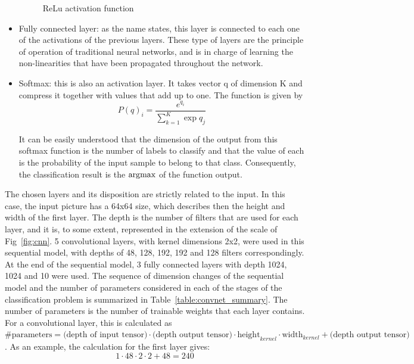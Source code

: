 \begin{itemize}
\begin{figure}[!htb]
              \caption{ReLu activation function}
              \label{fig:maxpool}
        \end{figure}
    \item Fully connected layer: as the name states, this layer is connected to each one of the activations of the previous layers. These type of layers are the principle of operation of traditional neural networks, and is in charge of learning the non-linearities that have been propagated throughout the network.
    \item Softmax: this is also an activation layer. It takes vector q of dimension K and compress it together with values that add up to one. The function is given by
        \begin{equation}
            P(q)_i = \frac{e^{q_i}}{\sum_{k=1}^{K} \exp{q_j}}
        \end{equation}

        It can be easily understood that the dimension of the output from this softmax function is the number of labels to classify and that the value of each is the probability of the input sample to belong to that class. Consequently, the classification result is the \( \operatorname*{\arg\!\max} \) of the function output.
\end{itemize}

The chosen layers and its disposition are strictly related to the input. In this case, the input picture has a 64x64 size, which describes then the height and width of the first layer. The depth is the number of filters that are used for each layer, and it is, to some extent, represented in the extension of the scale of Fig~\ref{fig:cnn}. 5 convolutional layers, with kernel dimensions 2x2, were used in this sequential model, with depths of 48, 128, 192, 192 and 128 filters correspondingly. At the end of the sequential model, 3 fully connected layers with depth 1024, 1024 and 10 were used. The sequence of dimension changes of the sequential model and the number of parameters considered in each of the stages of the classification problem is summarized in Table~\ref{table:convnet_summary}. The number of parameters is the number of trainable weights that each layer contains. For a convolutional layer, this is calculated as \( \text{\# parameters} = \text{(depth of input tensor)}\cdot\text{(depth output tensor)}\cdot\text{height}_{kernel}\cdot \text{width}_{kernel} + \text{(depth output tensor)} \). As an example, the calculation for the first layer gives:
\begin{equation*}
    1 \cdot 48 \cdot 2 \cdot 2 + 48 = 240
\end{equation*}

